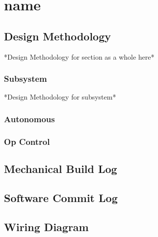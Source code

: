 \begingroup %
\renewcommand\thechapter{\#} %

\chapter[name]{name}

\section[Iteration \# Design Methodology]{Design Methodology}
*Design Methodology for section as a whole here*
\subsection[Iteration \# INSERT_SUBSECTION]{Subsystem}
*Design Methodology for subsystem*
\subsection[Iteration \# Autonomous]{Autonomous}
\subsection[Iteration \# Op Control]{Op Control}
\section[Iteration \# Mechanical Subsystems]{Mechanical Build Log}



\section[Iteration \# Code]{Software Commit Log}



\section[Iteration \# Wiring Diagram]{Wiring Diagram}

\endgroup %